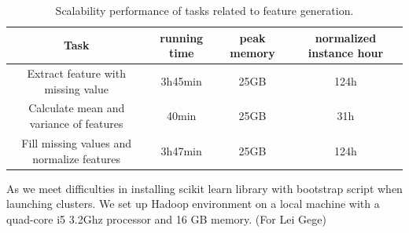 \begin{table}[H]
    \begin{tabular}{| c | c | c | c |}
    \hline
    Task & running time & peak memory & normalized instance hour \\
    \hline
    \hline
    Extract feature with missing value & 3h45min & 25GB & 124h\\
    \hline
    Calculate mean and variance of features & 40min & 25GB & 31h\\
    \hline
    Fill missing values and normalize features & 3h47min & 25GB & 124h\\
    \hline
    \end{tabular}
    \caption{Scalability performance of tasks related to feature generation.}
    \label{tbl:PerfTable}
\end{table}

As we meet difficulties in installing scikit learn library with bootstrap script when launching clusters. We set up Hadoop environment on a local machine with a quad-core i5 3.2Ghz processor and 16 GB memory.  {\color{red}(For Lei Gege)}

